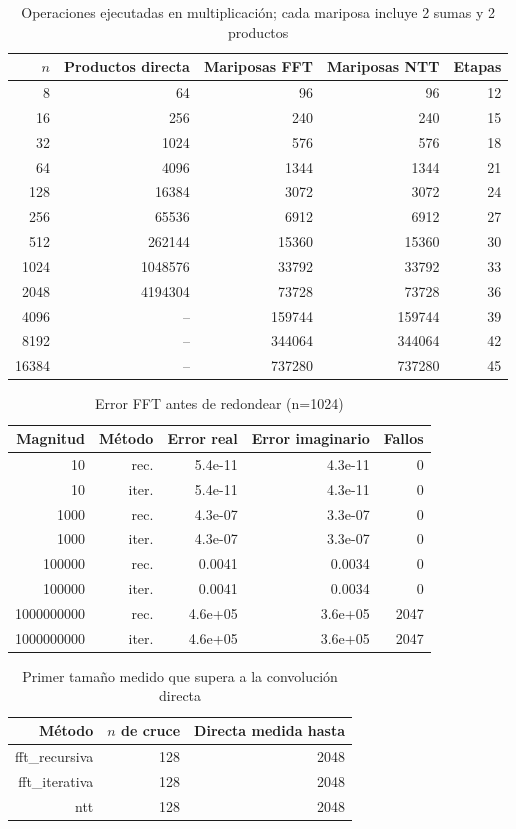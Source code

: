 \begin{table}[htbp]\centering\small
\caption{Operaciones ejecutadas en multiplicación; cada mariposa incluye 2 sumas y 2 productos}
\label{tab:operaciones}
\begin{tabular}{rrrrr}\toprule
$n$ & Productos directa & Mariposas FFT & Mariposas NTT & Etapas \\
\midrule
8 & 64 & 96 & 96 & 12 \\
16 & 256 & 240 & 240 & 15 \\
32 & 1024 & 576 & 576 & 18 \\
64 & 4096 & 1344 & 1344 & 21 \\
128 & 16384 & 3072 & 3072 & 24 \\
256 & 65536 & 6912 & 6912 & 27 \\
512 & 262144 & 15360 & 15360 & 30 \\
1024 & 1048576 & 33792 & 33792 & 33 \\
2048 & 4194304 & 73728 & 73728 & 36 \\
4096 & -- & 159744 & 159744 & 39 \\
8192 & -- & 344064 & 344064 & 42 \\
16384 & -- & 737280 & 737280 & 45 \\
\bottomrule\end{tabular}\end{table}

\begin{table}[htbp]\centering\small
\caption{Error FFT antes de redondear (n=1024)}
\label{tab:error}
\begin{tabular}{rrrrr}\toprule
Magnitud & Método & Error real & Error imaginario & Fallos \\
\midrule
10 & rec. & 5.4e-11 & 4.3e-11 & 0 \\
10 & iter. & 5.4e-11 & 4.3e-11 & 0 \\
1000 & rec. & 4.3e-07 & 3.3e-07 & 0 \\
1000 & iter. & 4.3e-07 & 3.3e-07 & 0 \\
100000 & rec. & 0.0041 & 0.0034 & 0 \\
100000 & iter. & 0.0041 & 0.0034 & 0 \\
1000000000 & rec. & 4.6e+05 & 3.6e+05 & 2047 \\
1000000000 & iter. & 4.6e+05 & 3.6e+05 & 2047 \\
\bottomrule\end{tabular}\end{table}

\begin{table}[htbp]\centering\small
\caption{Primer tamaño medido que supera a la convolución directa}
\label{tab:puntos_cruce}
\begin{tabular}{rrr}\toprule
Método & $n$ de cruce & Directa medida hasta \\
\midrule
fft\_recursiva & 128 & 2048 \\
fft\_iterativa & 128 & 2048 \\
ntt & 128 & 2048 \\
\bottomrule\end{tabular}\end{table}


